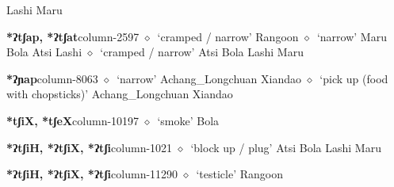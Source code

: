          Lashi 
\hspace{1ex}
         Maru 
  \item {\footnotesize \textbf{*ʔtʃap, *ʔtʃat}}{\tiny column-2597}
         $\diamond$~`cramped / narrow'
         Rangoon 
\hspace{1ex}
         $\diamond$~`narrow'
         Maru 
\hspace{1ex}
         Bola 
\hspace{1ex}
         Atsi 
\hspace{1ex}
         Lashi 
\hspace{1ex}
         $\diamond$~`cramped / narrow'
         Atsi 
\hspace{1ex}
         Bola 
\hspace{1ex}
         Lashi 
\hspace{1ex}
         Maru 
  \item {\footnotesize \textbf{*ʔɲap}}{\tiny column-8063}
         $\diamond$~`narrow'
         Achang\_Longchuan 
\hspace{1ex}
         Xiandao 
\hspace{1ex}
         $\diamond$~`pick up (food with chopsticks)'
         Achang\_Longchuan 
\hspace{1ex}
         Xiandao 
  \item {\footnotesize \textbf{*tʃiX, *tʃeX}}{\tiny column-10197}
         $\diamond$~`smoke'
         Bola 
  \item {\footnotesize \textbf{*ʔtʃiH, *ʔtʃiX, *ʔtʃi}}{\tiny column-1021}
         $\diamond$~`block up / plug'
         Atsi 
\hspace{1ex}
         Bola 
\hspace{1ex}
         Lashi 
\hspace{1ex}
         Maru 
  \item {\footnotesize \textbf{*ʔtʃiH, *ʔtʃiX, *ʔtʃi}}{\tiny column-11290}
         $\diamond$~`testicle'
         Rangoon 
